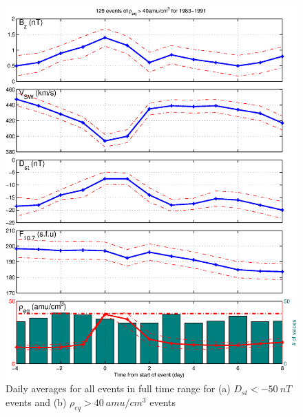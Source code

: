 \documentclass[10pt,twocolumn]{article}
\begin{document}
\begin{figure}[htp!]
\includegraphics[scale=0.45]{paperfigures/stormavs-mass-day.eps}
\caption{Daily averages for all events in full time range for (a) $D_{st}<-50~nT$ events and (b) $\rho_{eq}>40~amu/cm^3$ events}
\label{DailyAveragesAllData}
\end{figure}
\clearpage
\end{document}
